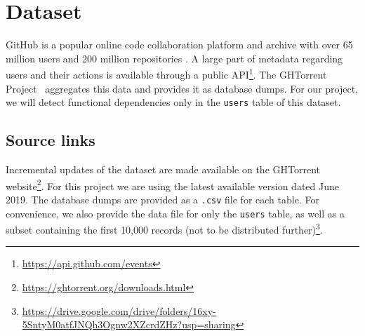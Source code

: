 \documentclass{article}
\begin{document}
\section{Dataset}\label{sec:dataset}
    
    GitHub is a popular online code collaboration platform and archive with over 65 million users and 200 million repositories \cite{github}. A large part of metadata regarding users and their actions is available through a public API\footnote{\href{https://api.github.com/events}{https://api.github.com/events}}. The GHTorrent Project~\cite{Gousi13} aggregates this data and provides it as database dumps. For our project, we will detect functional dependencies only in the \texttt{users} table of this dataset.
    
    
    \subsection{Source links}
    Incremental updates of the dataset are made available on the GHTorrent website\footnote{\href{https://ghtorrent.org/downloads.html}{https://ghtorrent.org/downloads.html}}. For this project we are using the latest available version dated June 2019. The database dumps are provided as a \texttt{.csv} file for each table. 
    For convenience, we also provide the data file for only the \texttt{users} table, as well as a subset containing the first 10,000 records (not to be distributed further)\footnote{\href{https://drive.google.com/drive/folders/16xy-5SntyM0atfJNQh3Ognw2XZcrdZHz?usp=sharing}{https://drive.google.com/drive/folders/16xy-5SntyM0atfJNQh3Ognw2XZcrdZHz?usp=sharing}}.
    
\end{document}
